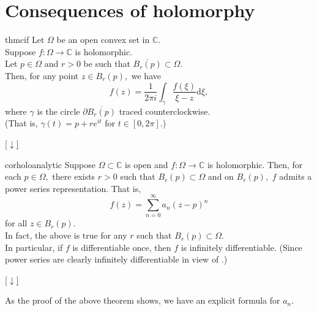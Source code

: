 \documentclass[12pt,oneside]{book}
\theoremstyle{definition}
\numberwithin{thm}{chapter}
\newcommand{\downsym}{[$\downarrow$]}
\begin{document}
\section{Consequences of holomorphy}
\begin{restatable}{thm}{cif}
\label{thm:cif}
	Let $\Omega$ be an open convex set in $\mathbb{C}.$\\
	Suppose $f:\Omega \to \mathbb{C}$ is holomorphic.\\
	Let $p \in \Omega$ and $r > 0$ be such that $\overline{B_r(p)} \subset \Omega.$\\
	Then, for any point $z \in B_r(p),$ we have
	\begin{equation*} 
		f(z) = \dfrac{1}{2\pi i}\int_{\gamma}^{} \dfrac{f(\xi)}{\xi - z} \mathrm{d}\xi,
	\end{equation*}
	where $\gamma$ is the circle $\partial \overline{B_r(p)}$ traced counterclockwise.\\
	(That is, $\gamma(t) = p + re^{it}$ for $t \in [0, 2\pi].$)
\end{restatable}
\begin{flushright}\hyperref[thm:cif2]{\downsym}\end{flushright}

\begin{restatable}{cor}{holoanalytic}
\label{cor:holoanalytic}
	Suppose $\Omega \subset \mathbb{C}$ is open and $f:\Omega \to \mathbb{C}$ is holomorphic. Then, for each $p \in \Omega,$ there exists $r > 0$ such that $B_r(p) \subset \Omega$ and on $B_r(p),$ $f$ admits a power series representation. That is,
	\begin{equation} \label{eq:holopowser}
		f(z) = \displaystyle\sum_{n=0}^{\infty}a_n(z - p)^n
	\end{equation}
	for all $z \in B_r(p).$\\
	In fact, the above is true for any $r$ such that $B_r(p) \subset \Omega.$\\
	In particular, if $f$ is differentiable once, then $f$ is infinitely differentiable. (Since power series are clearly infinitely differentiable in view of .)
\end{restatable}
\begin{flushright}\hyperref[cor:holoanalytic2]{\downsym}\end{flushright}

As the proof of the above theorem shows, we have an explicit formula for $a_n.$
\end{document}
